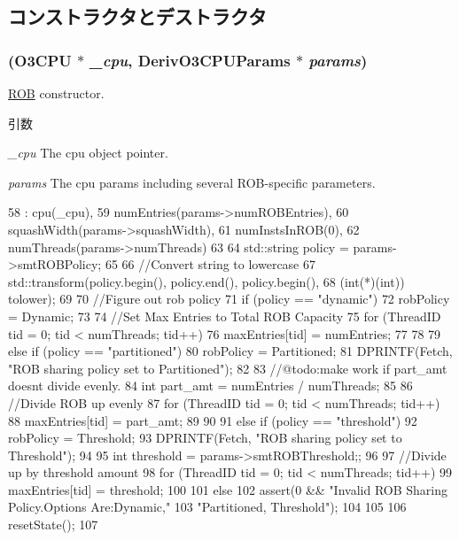 \subsection{コンストラクタとデストラクタ}
\hypertarget{classROB_a0fac6595ed6513e7b81d9098f6f345fb}{
\subsubsection[{ROB}]{ ({\bf O3CPU} $\ast$ {\em \_\-cpu}, \/  DerivO3CPUParams $\ast$ {\em params})}}
\label{classROB_a0fac6595ed6513e7b81d9098f6f345fb}
\hyperlink{classROB}{ROB} constructor. 
\begin{DoxyParams}{引数}
\item[{\em \_\-cpu}]The cpu object pointer. \item[{\em params}]The cpu params including several ROB-\/specific parameters. \end{DoxyParams}



\begin{DoxyCode}
58     : cpu(_cpu),
59       numEntries(params->numROBEntries),
60       squashWidth(params->squashWidth),
61       numInstsInROB(0),
62       numThreads(params->numThreads)
63 {
64     std::string policy = params->smtROBPolicy;
65 
66     //Convert string to lowercase
67     std::transform(policy.begin(), policy.end(), policy.begin(),
68                    (int(*)(int)) tolower);
69 
70     //Figure out rob policy
71     if (policy == "dynamic") {
72         robPolicy = Dynamic;
73 
74         //Set Max Entries to Total ROB Capacity
75         for (ThreadID tid = 0; tid < numThreads; tid++) {
76             maxEntries[tid] = numEntries;
77         }
78 
79     } else if (policy == "partitioned") {
80         robPolicy = Partitioned;
81         DPRINTF(Fetch, "ROB sharing policy set to Partitioned\n");
82 
83         //@todo:make work if part_amt doesnt divide evenly.
84         int part_amt = numEntries / numThreads;
85 
86         //Divide ROB up evenly
87         for (ThreadID tid = 0; tid < numThreads; tid++) {
88             maxEntries[tid] = part_amt;
89         }
90 
91     } else if (policy == "threshold") {
92         robPolicy = Threshold;
93         DPRINTF(Fetch, "ROB sharing policy set to Threshold\n");
94 
95         int threshold =  params->smtROBThreshold;;
96 
97         //Divide up by threshold amount
98         for (ThreadID tid = 0; tid < numThreads; tid++) {
99             maxEntries[tid] = threshold;
100         }
101     } else {
102         assert(0 && "Invalid ROB Sharing Policy.Options Are:{Dynamic,"
103                     "Partitioned, Threshold}");
104     }
105 
106     resetState();
107 }
\end{DoxyCode}


